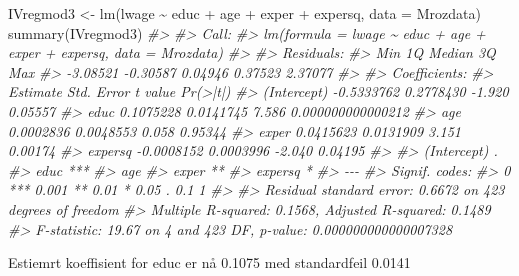 \documentclass[
]{article}
\newenvironment{Shaded}{\begin{snugshade}}{\end{snugshade}}
\newcommand{\AttributeTok}[1]{\textcolor[rgb]{0.77,0.63,0.00}{#1}}
\newcommand{\CommentTok}[1]{\textcolor[rgb]{0.56,0.35,0.01}{\textit{#1}}}
\newcommand{\FunctionTok}[1]{\textcolor[rgb]{0.00,0.00,0.00}{#1}}
\newcommand{\NormalTok}[1]{#1}
\newcommand{\OtherTok}[1]{\textcolor[rgb]{0.56,0.35,0.01}{#1}}
\newcommand{\SpecialCharTok}[1]{\textcolor[rgb]{0.00,0.00,0.00}{#1}}
\begin{document}
\begin{Shaded}
\begin{Highlighting}[]
\NormalTok{IVregmod3 }\OtherTok{\textless{}{-}} \FunctionTok{lm}\NormalTok{(lwage }\SpecialCharTok{\textasciitilde{}}\NormalTok{ educ }\SpecialCharTok{+}\NormalTok{ age }\SpecialCharTok{+}\NormalTok{ exper }\SpecialCharTok{+}\NormalTok{ expersq, }\AttributeTok{data =}\NormalTok{ Mrozdata)}
\FunctionTok{summary}\NormalTok{(IVregmod3)}
\CommentTok{\#\textgreater{} }
\CommentTok{\#\textgreater{} Call:}
\CommentTok{\#\textgreater{} lm(formula = lwage \textasciitilde{} educ + age + exper + expersq, data = Mrozdata)}
\CommentTok{\#\textgreater{} }
\CommentTok{\#\textgreater{} Residuals:}
\CommentTok{\#\textgreater{}      Min       1Q   Median       3Q      Max }
\CommentTok{\#\textgreater{} {-}3.08521 {-}0.30587  0.04946  0.37523  2.37077 }
\CommentTok{\#\textgreater{} }
\CommentTok{\#\textgreater{} Coefficients:}
\CommentTok{\#\textgreater{}               Estimate Std. Error t value          Pr(\textgreater{}|t|)}
\CommentTok{\#\textgreater{} (Intercept) {-}0.5333762  0.2778430  {-}1.920           0.05557}
\CommentTok{\#\textgreater{} educ         0.1075228  0.0141745   7.586 0.000000000000212}
\CommentTok{\#\textgreater{} age          0.0002836  0.0048553   0.058           0.95344}
\CommentTok{\#\textgreater{} exper        0.0415623  0.0131909   3.151           0.00174}
\CommentTok{\#\textgreater{} expersq     {-}0.0008152  0.0003996  {-}2.040           0.04195}
\CommentTok{\#\textgreater{}                }
\CommentTok{\#\textgreater{} (Intercept) .  }
\CommentTok{\#\textgreater{} educ        ***}
\CommentTok{\#\textgreater{} age            }
\CommentTok{\#\textgreater{} exper       ** }
\CommentTok{\#\textgreater{} expersq     *  }
\CommentTok{\#\textgreater{} {-}{-}{-}}
\CommentTok{\#\textgreater{} Signif. codes:  }
\CommentTok{\#\textgreater{} 0 \textquotesingle{}***\textquotesingle{} 0.001 \textquotesingle{}**\textquotesingle{} 0.01 \textquotesingle{}*\textquotesingle{} 0.05 \textquotesingle{}.\textquotesingle{} 0.1 \textquotesingle{} \textquotesingle{} 1}
\CommentTok{\#\textgreater{} }
\CommentTok{\#\textgreater{} Residual standard error: 0.6672 on 423 degrees of freedom}
\CommentTok{\#\textgreater{} Multiple R{-}squared:  0.1568, Adjusted R{-}squared:  0.1489 }
\CommentTok{\#\textgreater{} F{-}statistic: 19.67 on 4 and 423 DF,  p{-}value: 0.000000000000007328}
\end{Highlighting}
\end{Shaded}

Estiemrt koeffisient for educ er nå 0.1075 med standardfeil 0.0141
\end{document}
